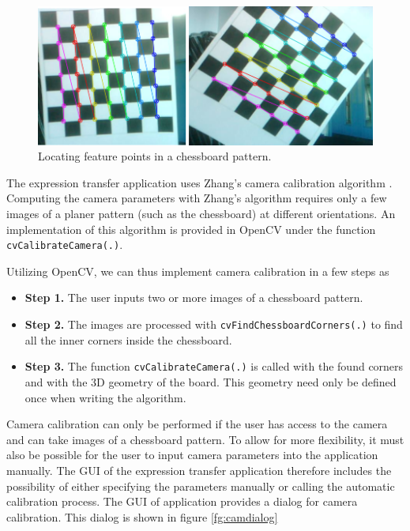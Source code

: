 \documentclass[11pt,a4paper]{report}
\begin{document}
\begin{figure}[H]
\begin{centering}
\includegraphics[scale=0.48]{images/chessboard_pattern.png}
\par\end{centering}

\caption{Locating feature points in a chessboard pattern.}
\label{fg:chessboard}

\end{figure}

The expression transfer application uses Zhang's camera calibration algorithm
\cite{zhang}. Computing the camera parameters with Zhang's algorithm requires
only a few images of a planer pattern (such as the chessboard) at different
orientations. An implementation of this algorithm is provided in OpenCV under the
function \texttt{cvCalibrateCamera(.)}. 

Utilizing OpenCV, we can thus implement camera calibration in a few steps as
\begin{itemize}
\item \textbf{Step 1.} The user inputs two or more images of a chessboard
  pattern.
\item \textbf{Step 2.} The images are processed with
  \texttt{cvFindChessboardCorners(.)} to find all the inner corners inside the
  chessboard.
\item \textbf{Step 3.} The function \texttt{cvCalibrateCamera(.)} is called with
  the found corners and with the 3D geometry of the board. This geometry need
  only be defined once when writing the algorithm.
\end{itemize}


Camera calibration can only be performed if the
user has access to the camera and can take images of a chessboard pattern. To
allow for more flexibility, it must also be possible for the user to
input camera parameters into the application manually. The GUI of the expression
transfer application therefore includes the possibility of either specifying the
parameters manually or calling the automatic calibration process. The GUI of
application provides a dialog for camera calibration. This dialog is shown in
figure \ref{fg:camdialog}
\end{document}
